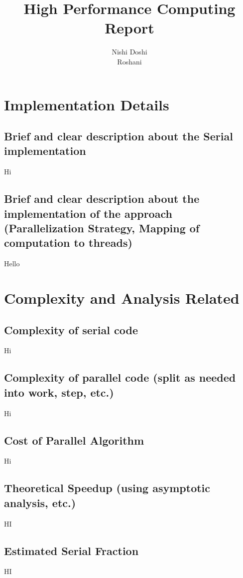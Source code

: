 \documentclass[runningheads, a4paper, oribibl]{llncs}
\begin{document}
\mainmatter

\title{High Performance Computing Report}
\author{Nishi Doshi\\Roshani}

\maketitle
\section{Implementation Details}
\subsection{Brief and clear description about the Serial implementation}
Hi
\subsection{Brief and clear description about the implementation of the approach (Parallelization Strategy, Mapping of computation to threads)}
Hello

\section{Complexity and Analysis Related}\subsection{Complexity of serial code}
Hi
\subsection{Complexity of parallel code (split as needed into work, step, etc.) }
Hi
\subsection{Cost of Parallel Algorithm}
Hi
\subsection{Theoretical Speedup (using asymptotic analysis, etc.)}
HI
\subsection{Estimated Serial Fraction }
HI
\end{document}

